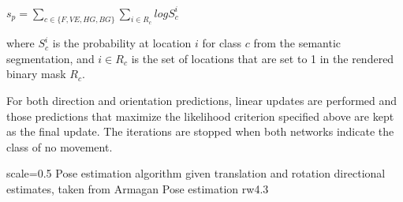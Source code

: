 $s_p = \sum_{c \in \{F, VE, HG, BG\}}\sum_{i \in R_c} log S_c^i$

where $S^i_c$ is the probability at location $i$ for class $c$ from the semantic segmentation, and ${i\in R_c}$ is the set of locations that are set to 1 in the rendered binary mask $R_c$.

For both direction and orientation predictions, linear updates are performed and those predictions that maximize the likelihood criterion specified above are kept as the final update. The iterations are stopped when both networks indicate the class of no movement. 

{scale=0.5}%
{Pose estimation algorithm given translation and rotation directional estimates, taken from \cite{Armagan2017}}%
{Armagan Pose estimation}%
{rw4.3} %



 




